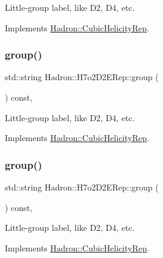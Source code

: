 Little-\/group label, like D2, D4, etc. 

Implements \mbox{\hyperlink{structHadron_1_1CubicHelicityRep_a101a7d76cd8ccdad0f272db44b766113}{Hadron\+::\+Cubic\+Helicity\+Rep}}.

\mbox{\label{structHadron_1_1H7o2D2ERep_a01d61c7d2d2ee0a909d40c5d43a90e09}} 
\subsubsection{\texorpdfstring{group()}{group()}\hspace{0.1cm}{\footnotesize\ttfamily [3/5]}}
{\footnotesize\ttfamily std\+::string Hadron\+::\+H7o2\+D2\+E\+Rep\+::group (\begin{DoxyParamCaption}{ }\end{DoxyParamCaption}) const\hspace{0.3cm}{\ttfamily [inline]}, {\ttfamily [virtual]}}

Little-\/group label, like D2, D4, etc. 

Implements \mbox{\hyperlink{structHadron_1_1CubicHelicityRep_a101a7d76cd8ccdad0f272db44b766113}{Hadron\+::\+Cubic\+Helicity\+Rep}}.

\mbox{\label{structHadron_1_1H7o2D2ERep_a01d61c7d2d2ee0a909d40c5d43a90e09}} 
\subsubsection{\texorpdfstring{group()}{group()}\hspace{0.1cm}{\footnotesize\ttfamily [4/5]}}
{\footnotesize\ttfamily std\+::string Hadron\+::\+H7o2\+D2\+E\+Rep\+::group (\begin{DoxyParamCaption}{ }\end{DoxyParamCaption}) const\hspace{0.3cm}{\ttfamily [inline]}, {\ttfamily [virtual]}}

Little-\/group label, like D2, D4, etc. 

Implements \mbox{\hyperlink{structHadron_1_1CubicHelicityRep_a101a7d76cd8ccdad0f272db44b766113}{Hadron\+::\+Cubic\+Helicity\+Rep}}.


